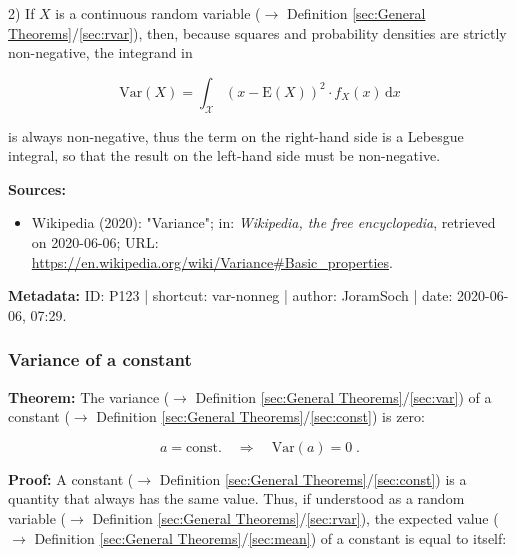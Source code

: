 \documentclass[a4paper,12pt,twoside]{book}
\begin{document}
\vspace{1em}
2) If $X$ is a continuous random variable ($\rightarrow$ Definition \ref{sec:General Theorems}/\ref{sec:rvar}), then, because squares and probability densities are strictly non-negative, the integrand in

\begin{equation} \label{eq:var-nonneg-var-cont}
\mathrm{Var}(X) = \int_{\mathcal{X}} (x-\mathrm{E}(X))^2 \cdot f_X(x) \, \mathrm{d}x
\end{equation}

is always non-negative, thus the term on the right-hand side is a Lebesgue integral, so that the result on the left-hand side must be non-negative.


\vspace{1em}
\textbf{Sources:}
\begin{itemize}
\item Wikipedia (2020): "Variance"; in: \textit{Wikipedia, the free encyclopedia}, retrieved on 2020-06-06; URL: \url{https://en.wikipedia.org/wiki/Variance#Basic_properties}.
\end{itemize}


\vspace{1em}
\textbf{Metadata:} ID: P123 | shortcut: var-nonneg | author: JoramSoch | date: 2020-06-06, 07:29.
\vspace{1em}



\subsubsection[\textbf{Variance of a constant}]{Variance of a constant} \label{sec:var-const}
\setcounter{equation}{0}

\textbf{Theorem:} The variance ($\rightarrow$ Definition \ref{sec:General Theorems}/\ref{sec:var}) of a constant ($\rightarrow$ Definition \ref{sec:General Theorems}/\ref{sec:const}) is zero:

\begin{equation} \label{eq:var-const-var-const}
a = \text{const.} \quad \Rightarrow \quad \mathrm{Var}(a) = 0 \; .
\end{equation}


\vspace{1em}
\textbf{Proof:} A constant ($\rightarrow$ Definition \ref{sec:General Theorems}/\ref{sec:const}) is a quantity that always has the same value. Thus, if understood as a random variable ($\rightarrow$ Definition \ref{sec:General Theorems}/\ref{sec:rvar}), the expected value ($\rightarrow$ Definition \ref{sec:General Theorems}/\ref{sec:mean}) of a constant is equal to itself:
\end{document}

